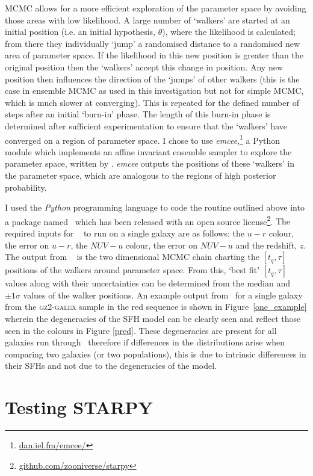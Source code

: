 MCMC allows for a more efficient exploration of the parameter space by avoiding those areas with low likelihood. A large number of `walkers' are started at an initial position (i.e. an initial hypothesis, $\theta$), where the likelihood is calculated; from there they individually `jump' a randomised distance to a randomised new area of parameter space. If the likelihood in this new position is greater than the original position then the `walkers' accept this change in position. Any new position then influences the direction of the  `jumps' of other walkers (this is the case in ensemble MCMC as used in this investigation but not for simple MCMC, which is much slower at converging). This is repeated for the defined number of steps after an initial `burn-in' phase. The length of this burn-in phase is determined after sufficient experimentation to ensure that the `walkers' have converged on a region of parameter space. I chose to use \emph{emcee},\footnote{\url{dan.iel.fm/emcee/}} a Python module which implements an affine invariant ensemble sampler to explore the parameter space, written by \cite{emcee13}. \emph{emcee} outputs the positions of these `walkers' in the parameter space, which are analogous to the regions of high posterior probability. 

I used the \emph{Python} programming language to code the routine outlined above into a package named \starpy ~which has been released with an open source license\footnote{\url{github.com/zooniverse/starpy}}. {\minor The required inputs for \starpy~ to run on a single galaxy	 are as follows: the $u-r$ colour, the error on $u-r$, the $NUV-u$ colour, the error on $NUV-u$ and the redshift, $z$. The output from \starpy~ is the two dimensional MCMC chain charting the $[t_q, \tau]$ positions of the walkers around parameter space. From this, `best fit' $[t_q, \tau]$ values along with their uncertainties can be determined from the median and $\pm1\sigma$ values of the walker positions.} An example output from \starpy~for a single galaxy from the \textsc{gz2-galex} sample in the red sequence is shown in Figure~\ref{one_example} wherein the degeneracies of the SFH model can be clearly seen and reflect those seen in the colours in Figure \ref{pred}. These degeneracies are present for all galaxies run through \starpy\ therefore if differences in the distributions arise when comparing two galaxies (or two populations), this is due to intrinsic differences in their SFHs and not due to the degeneracies of the model. 

\section{Testing STARPY}

